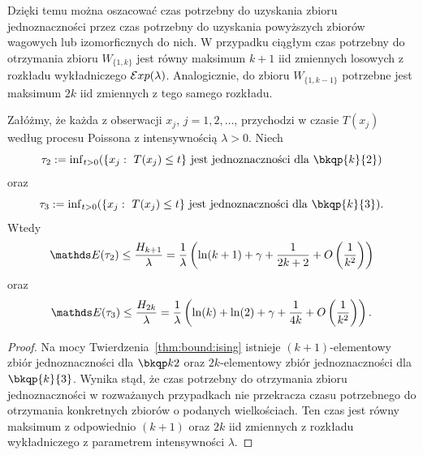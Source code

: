 \noindent
Dzięki temu można oszacować czas potrzebny do uzyskania zbioru jednoznaczności przez czas potrzebny do uzyskania powyższych zbiorów wagowych lub izomorficznych do nich. W przypadku ciągłym czas potrzebny do otrzymania zbioru $W_{\{1,k\}}$ jest równy maksimum $k+1$ iid zmiennych losowych z rozkładu wykładniczego $\mathcal{E}xp(\lambda)$. Analogicznie, do zbioru $W_{\{1,k-1\}}$ potrzebne jest maksimum $2k$ iid zmiennych z tego samego rozkładu.

\noindent
\begin{theorem}\label{thm:ising:dys}
Załóżmy, że każda z obserwacji $x_j$, $j=1,2,\ldots$, przychodzi w czasie $T(x_j)$ według procesu Poissona z intensywnością $\lambda>0$. Niech 
$$
\tau_2:={\rm{inf}}_{t>0}(\{x_j:\ T(x_j)\leq t\}\ {\rm{jest\ jednoznaczno{\textrm{\'s}}ci\ dla\ }} \bkqp{k}{2})
$$    
oraz
$$
\tau_3:={\rm{inf}}_{t>0}(\{x_j:\ T(x_j)\leq t\}\ {\rm{jest\ jednoznaczno{\textrm{\'s}}ci\ dla\ }} \bkqp{k}{3}).
$$ 
Wtedy
$$
\EE(\tau_2) \leq \frac{H_{k+1}}{\lambda} = \frac{1}{\lambda} \left(\ln(k+1)+\gamma+\frac{1}{2k+2}+O\left(\frac{1}{k^2}\right)\right)
$$
oraz
$$
\EE(\tau_3) \leq \frac{H_{2k}}{\lambda} = \frac{1}{\lambda} \left(\ln(k)+\ln(2)+\gamma+\frac{1}{4k}+O\left(\frac{1}{k^2}\right)\right).
$$
\end{theorem}
\begin{proof}
Na mocy Twierdzenia~\ref{thm:bound:ising} istnieje $(k+1)$-elementowy zbiór jednoznaczności dla $\ising$ oraz $2k$-elementowy zbiór jednoznaczności dla $\bkqp{k}{3}$. Wynika stąd, że czas potrzebny do otrzymania zbioru jednoznaczności w rozważanych przypadkach nie przekracza czasu potrzebnego do otrzymania konkretnych zbiorów o podanych wielkościach. Ten czas jest równy maksimum z odpowiednio $(k+1)$ oraz $2k$ iid zmiennych z rozkładu wykładniczego z parametrem intensywności $\lambda$.
\end{proof}



